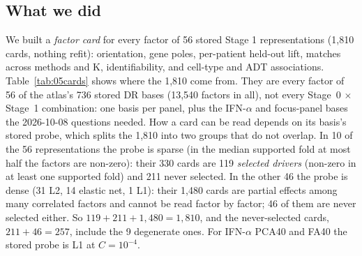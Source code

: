\subsection*{What we did}
We built a \emph{factor card} for every factor of 56 stored Stage 1 representations (1,810 cards, nothing refit): orientation, gene poles, per-patient held-out lift, matches across methods and K, identifiability, and cell-type and ADT associations. Table~\ref{tab:05cards} shows where the 1,810 come from. They are every factor of 56 of the atlas's 736 stored DR bases (13,540 factors in all), not every Stage~0 $\times$ Stage~1 combination: one basis per panel, plus the IFN-$\alpha$ and focus-panel bases the 2026-10-08 questions needed. How a card can be read depends on its basis's stored probe, which splits the 1,810 into two groups that do not overlap. In 10 of the 56 representations the probe is sparse (in the median supported fold at most half the factors are non-zero): their 330 cards are 119 \emph{selected drivers} (non-zero in at least one supported fold) and 211 never selected. In the other 46 the probe is dense (31 L2, 14 elastic net, 1 L1): their 1,480 cards are partial effects among many correlated factors and cannot be read factor by factor; 46 of them are never selected either. So $119 + 211 + 1{,}480 = 1{,}810$, and the never-selected cards, $211 + 46 = 257$, include the 9 degenerate ones. For IFN-$\alpha$ PCA40 and FA40 the stored probe is L1 at $C=10^{-4}$.

